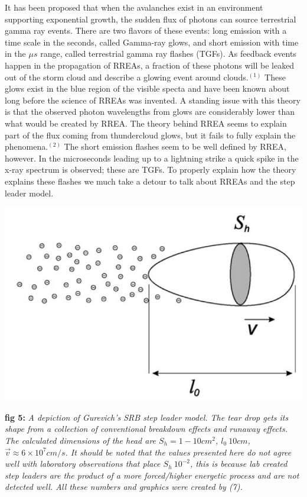\documentclass[11pt]{article}
\begin{document}
\begin{multicols*}{2}
    It has been proposed that when the avalanches exist in an environment supporting exponential growth, the sudden flux of photons can source terrestrial gamma ray events. There are two flavors of these events: long emission with a time scale in the seconds, called Gamma-ray glows, and short emission with time in the $\mu s$ range, called terrestrial gamma ray flashes (TGFs). As feedback events happen in the propagation of RREAs, a fraction of these photons will be leaked out of the storm cloud and describe a glowing event around clouds.$^{(1)}$ These glows exist in the blue region of the visible specta and have been known about long before the science of RREAs was invented. A standing issue with this theory is that the observed photon wavelengths from glows are considerably lower than what would be created by RREA. The theory behind RREA seems to explain part of the flux coming from thundercloud glows, but it fails to fully explain the phenomena.$^{(2)}$ The short emission flashes seem to be well defined by RREA, however. In the microseconds leading up to a lightning strike a quick spike in the x-ray spectrum is observed; these are TGFs. To properly explain how the theory explains these flashes we much take a detour to talk about RREAs and the step leader model.
    
    \begin{center}
        \includegraphics[width=\linewidth]{images/step leader.JPG}
    \end{center}
    \textbf{fig 5:} \textit{A depiction of Gurevich's SRB step leader model. The tear drop gets its shape from a collection of conventional breakdown effects and runaway effects. The calculated dimensions of the head are $S_h = 1-10 cm^2$, $l_0 ~ 10 cm$, $\Vec{v} \approx 6 \times 10^7 cm/s$. It should be noted that the values presented here do not agree well with laboratory observations that place $S_h ~ 10^{-2}$, this is because lab created step leaders are the product of a more forced/higher energetic process and are not detected well. All these numbers and graphics were created by (7).}
    \newline
    

\end{multicols*}
\end{document}
